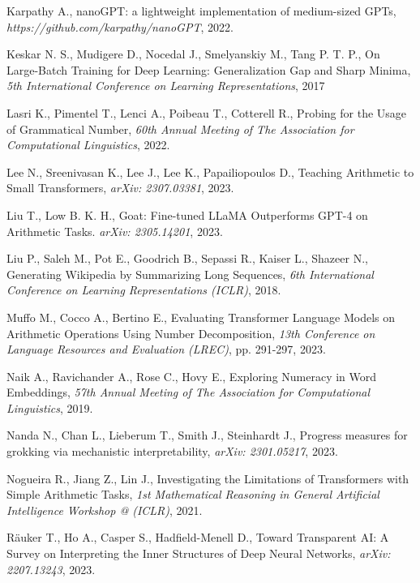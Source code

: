 \documentclass[final,1p,times,authoryear]{elsarticle}
\begin{document}
\begin{thebibliography}{00}
Karpathy A., nanoGPT: a lightweight implementation of medium-sized GPTs, {\em https://github.com/karpathy/nanoGPT}, 2022.

Keskar N. S., Mudigere D., Nocedal J., Smelyanskiy M., Tang P. T. P., On Large-Batch Training for Deep Learning: Generalization Gap and Sharp Minima, {\em 5th International Conference on Learning Representations}, 2017

Lasri K., Pimentel T., Lenci A., Poibeau T., Cotterell R., Probing for the Usage of Grammatical Number, {\em 60th Annual Meeting of The Association for Computational Linguistics}, 2022.

Lee N., Sreenivasan K., Lee J., Lee K., Papailiopoulos D., Teaching Arithmetic to Small Transformers, {\em arXiv: 2307.03381}, 2023.

Liu T., Low B. K. H., Goat: Fine-tuned LLaMA Outperforms GPT-4 on Arithmetic Tasks. {\em arXiv: 2305.14201}, 2023.

Liu P., Saleh M., Pot E., Goodrich B., Sepassi R., Kaiser L., Shazeer N., Generating Wikipedia by Summarizing Long Sequences, {\em 6th International Conference on Learning Representations (ICLR)}, 2018.

Muffo M., Cocco A., Bertino E., Evaluating Transformer Language Models on Arithmetic Operations Using Number Decomposition, {\em 13th Conference on Language Resources and Evaluation (LREC)}, pp. 291-297, 2023.

Naik A., Ravichander A., Rose C., Hovy E., Exploring Numeracy in Word Embeddings, {\em 57th Annual Meeting of The Association for Computational Linguistics}, 2019.

Nanda N., Chan L., Lieberum T., Smith J., Steinhardt J., Progress measures for grokking via mechanistic interpretability, {\em arXiv: 2301.05217}, 2023.

Nogueira R., Jiang Z., Lin J., Investigating the Limitations of Transformers with Simple Arithmetic Tasks, {\em 1st Mathematical Reasoning in General Artificial Intelligence Workshop @ (ICLR)}, 2021.

Räuker T., Ho A., Casper S., Hadfield-Menell D., Toward Transparent AI: A Survey on Interpreting the Inner Structures of Deep Neural Networks, {\em arXiv: 2207.13243}, 2023.


\end{thebibliography}
\end{document}
